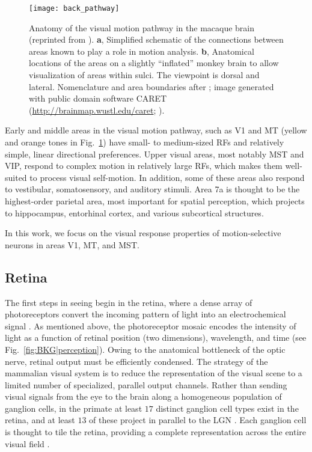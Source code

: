 \begin{figure}[t]
  \centering
  \texttt{[image: back\_pathway]}
  \caption{
  Anatomy of the visual motion pathway in the macaque brain
  (reprinted from \citep{Britten2008}).
  \textbf{a}, Simplified schematic of the connections between areas known to
  play a role in motion analysis. \textbf{b}, Anatomical locations of the areas
  on a slightly ``inflated'' monkey brain to allow visualization of areas within
  sulci. The viewpoint is dorsal and lateral. Nomenclature and area boundaries
  after \cite{FellemanVanEssen1991}; image generated with public domain software
  CARET (\url{http://brainmap.wustl.edu/caret}; \cite{vanEssen2001}).}
  \label{fig:BKG|pathway}
\end{figure}

Early and middle areas in the visual motion pathway,
such as \ac{V1} and \ac{MT} (yellow and orange tones in
Fig.~\ref{fig:BKG|pathway}) have small- to medium-sized \acp{RF} and relatively
simple, linear directional preferences.
Upper visual areas, most notably \ac{MST} and \ac{VIP}, respond to complex
motion in relatively large \acp{RF}, which makes them well-suited to process
visual self-motion.
In addition, some of these areas also respond to vestibular, somatosensory,
and auditory stimuli.
Area 7a is thought to be the highest-order parietal area,
most important for spatial perception,
which projects to hippocampus, entorhinal cortex, and various subcortical
structures.

In this work, we focus on the visual response properties of
motion-selective neurons in areas \ac{V1}, \ac{MT}, and \ac{MST}.



\subsection{Retina}
\label{sec:BKG|retina}

The first steps in seeing begin in the retina, where a dense array
of photoreceptors convert the incoming pattern of light into an
electrochemical signal \citep{NassiCallaway2009}.
As mentioned above, the photoreceptor mosaic encodes the intensity of
light as a function of retinal position (two dimensions), wavelength,
and time (see Fig.~\ref{fig:BKG|perception}).
Owing to the anatomical bottleneck of the optic nerve, retinal output
must be efficiently condensed.
The strategy of the mammalian visual system is to reduce the
representation of the visual scene to a limited number of specialized,
parallel output channels.
Rather than sending visual signals from the eye to the brain along
a homogeneous population of ganglion cells, in the primate at least
$17$ distinct ganglion cell types exist in the retina,
and at least $13$ of these project in parallel to the \ac{LGN}
\citep{Dacey2004}.
Each ganglion cell is thought to tile the retina, providing a complete
representation across the entire visual field \citep{FieldChichilnisky2007}.

